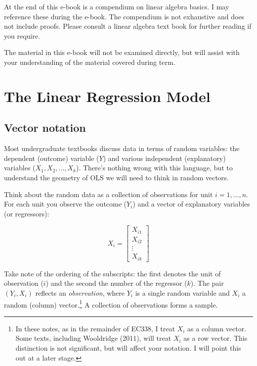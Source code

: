\documentclass[
  letterpaper,
  DIV=11,
  numbers=noendperiod]{scrreprt}
\begin{document}
At the end of this e-book is a compendium on linear algebra basics. I
may reference these during the e-book. The compendium is not exhaustive
and does not include proofs. Please consult a linear algebra text book
for further reading if you require.

The material in this e-book will not be examined directly, but will
assist with your understanding of the material covered during term.


\hypertarget{the-linear-regression-model}{%
\chapter{The Linear Regression
Model}\label{the-linear-regression-model}}

\hypertarget{vector-notation}{%
\section{Vector notation}\label{vector-notation}}

Most undergraduate textbooks discuss data in terms of random variables:
the dependent (outcome) variable (\(Y\)) and various independent
(explanatory) variables (\(X_1,X_2,\ldots,X_k\)). There's nothing wrong
with this language, but to understand the geometry of OLS we will need
to think in random vectors.

Think about the random data as a collection of observations for unit
\(i=1,\ldots,n\). For each unit you observe the outcome (\(Y_i\)) and a
vector of explanatory variables (or regressors):

\[
X_i = \begin{bmatrix}X_{i1} \\ X_{i2} \\ \vdots \\ X_{ik}\end{bmatrix}
\]

Take note of the ordering of the subscripts: the first denotes the unit
of observation (\(i\)) and the second the number of the regressor
(\(k\)). The pair \((Y_i,X_i)\) reflects an \emph{observation}, where
\(Y_i\) is a single random variable and \(X_i\) a random (column)
vector.\footnote{In these notes, as in the remainder of EC338, I treat
  \(X_i\) as a column vector. Some texts, including Wooldridge (2011),
  will treat \(X_i\) as a row vector. This distinction is not
  significant, but will affect your notation. I will point this out at a
  later stage.} A collection of observations forms a sample.
\end{document}
